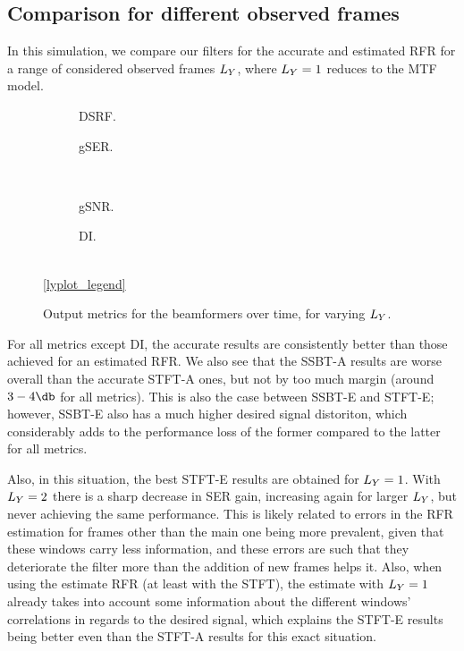 \subsection{Comparison for different observed frames}

In this simulation, we compare our filters for the accurate and estimated RFR for a range of considered observed frames $\Ly$, where $\Ly = 1$ reduces to the MTF model.

\begin{figure}[H]
	\centering
	\begin{subfigure}{0.49\textwidth}
		\centering
		
		\caption{DSRF.}
		\label{subfig:lineplot__DSRF__iSER_n15__Ly_var}
	\end{subfigure}\hfill
	\begin{subfigure}{0.49\textwidth}
		\centering
		
		\caption{gSER.}
		\label{subfig:lineplot__gSER__iSER_n15__Ly_var}
	\end{subfigure}\\[1em]
	\begin{subfigure}{0.49\textwidth}
		\centering
		
		\caption{gSNR.}
		\label{subfig:lineplot__gSNR__iSER_n15__Ly_var}
	\end{subfigure}\hfill
	\begin{subfigure}{0.49\textwidth}
		\centering
		
		\caption{DI.}
		\label{subfig:lineplot__DI__iSER_n15__Ly_var}
	\end{subfigure}\\[1em]
	\ref*{lyplot_legend}
	\caption{Output metrics for the beamformers over time, for varying $\Ly$.}
	\label{fig:lineplot__iSER_n15__Ly_var}
\end{figure}

For all metrics except DI, the accurate results are consistently better than those achieved for an estimated RFR. We also see that the SSBT-A results are worse overall than the accurate STFT-A ones, but not by too much margin (around $3-4\dB$ for all metrics). This is also the case between SSBT-E and STFT-E; however, SSBT-E also has a much higher desired signal distoriton, which considerably adds to the performance loss of the former compared to the latter for all metrics.

Also, in this situation, the best STFT-E results are obtained for $\Ly = 1$. With $\Ly = 2$ there is a sharp decrease in SER gain, increasing again for larger $\Ly$, but never achieving the same performance. This is likely related to errors in the RFR estimation for frames other than the main one being more prevalent, given that these windows carry less information, and these errors are such that they deteriorate the filter more than the addition of new frames helps it. Also, when using the estimate RFR (at least with the STFT), the estimate with $\Ly = 1$ already takes into account some information about the different windows' correlations in regards to the desired signal, which explains the STFT-E results being better even than the STFT-A results for this exact situation.

